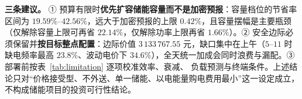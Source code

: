 \textbf{三条建议。} ① 预算有限时\textbf{优先扩容储能容量而不是加密预报}：容量档位的节省率区间为
\(19.59\%\)--\(42.56\%\)，远大于加密预报的上限 \(0.42\%\)，且容量摆幅是主要瓶颈（仅解除容量上限可再省
\(22.14\%\)，仅解除功率上限再省 \(1.66\%\)）。② 安全边际必须保留并\textbf{按目标整点配置}：边际价值
\(3\,133\,767.55\) 元，缺口集中在上午（\(5\)--\(11\) 时缺电频率最高 \(23.8\%\)、波动电价下
\(34.6\%\)），全天统一加成会同时浪费与漏配。③ 部署前按表~\ref{tab:limitation} 逐项校准效率、衰减、
负载预测与终端条件。上述结论只对“价格接受型、不外送、单一储能、以电能量购电费用最小”这一设定成立，
不构成储能项目的投资可行性结论。
